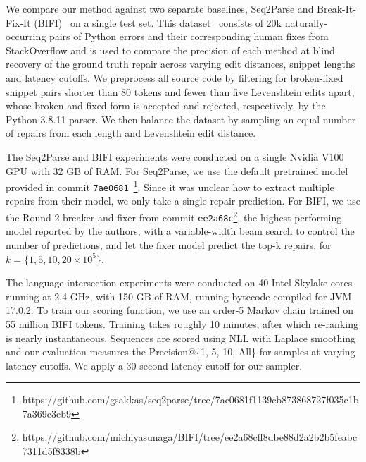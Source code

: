 \documentclass[sigplan,review,acmsmall,nonacm,anonymous]{acmart}\settopmatter{printfolios=false,printccs=false,printacmref=false}
\begin{document}
  We compare our method against two separate baselines, Seq2Parse and Break-It-Fix-It (BIFI)~\cite{yasunaga2021break} on a single test set. This dataset~\cite{wong2019syntax} consists of 20k naturally-occurring pairs of Python errors and their corresponding human fixes from StackOverflow and is used to compare the precision of each method at blind recovery of the ground truth repair across varying edit distances, snippet lengths and latency cutoffs. We preprocess all source code by filtering for broken-fixed snippet pairs shorter than 80 tokens and fewer than five Levenshtein edits apart, whose broken and fixed form is accepted and rejected, respectively, by the Python 3.8.11 parser. We then balance the dataset by sampling an equal number of repairs from each length and Levenshtein edit distance.


  The Seq2Parse and BIFI experiments were conducted on a single Nvidia V100 GPU with 32 GB of RAM. For Seq2Parse, we use the default pretrained model provided in commit \texttt{7ae0681}~\footnote{https://github.com/gsakkas/seq2parse/tree/7ae0681f1139cb873868727f035c1b7a369c3eb9}. Since it was unclear how to extract multiple repairs from their model, we only take a single repair prediction. For BIFI, we use the Round 2 breaker and fixer from commit \texttt{ee2a68c}\footnote{https://github.com/michiyasunaga/BIFI/tree/ee2a68cff8dbe88d2a2b2b5feabc7311d5f8338b}, the highest-performing model reported by the authors, with a variable-width beam search to control the number of predictions, and let the fixer model predict the top-k repairs, for $k=\{1, 5, 10, 20\times10^5\}$.

  The language intersection experiments were conducted on 40 Intel Skylake cores running at 2.4 GHz, with 150 GB of RAM, running bytecode compiled for JVM 17.0.2. To train our scoring function, we use an order-5 Markov chain trained on 55 million BIFI tokens. Training takes roughly 10 minutes, after which re-ranking is nearly instantaneous. Sequences are scored using NLL with Laplace smoothing and our evaluation measures the Precision@\{1, 5, 10, All\} for samples at varying latency cutoffs. We apply a 30-second latency cutoff for our sampler.

\end{document}
